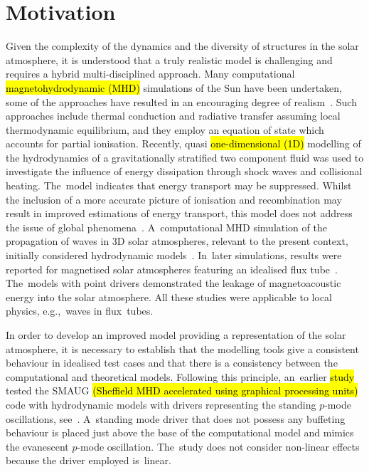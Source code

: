 \documentclass[physics,article,accept,pdftex,moreauthors]{Definitions/mdpi}
\begin{document}
\section{Motivation}\label{sec2}
\label{sec:motivation}

Given the complexity of the dynamics and the diversity of structures in the solar atmosphere, it is understood that a truly realistic model is challenging and  requires a hybrid multi-disciplined approach. Many computational 
 \hl{magnetohydrodynamic (MHD)}  
simulations of the Sun have been undertaken, some of the approaches have resulted in an encouraging degree of realism~\cite{Vogler2005,Gudiksen2011}. Such approaches include thermal conduction and radiative transfer assuming local thermodynamic equilibrium, and they employ an equation of state which accounts for partial ionisation.  Recently, quasi 
\hl{one-dimensional
(1D)}  
modelling of the hydrodynamics of a gravitationally stratified two component fluid was used to investigate the influence of energy dissipation through shock waves and collisional heating. The~model indicates that energy transport may be suppressed. Whilst the inclusion of a more accurate picture of ionisation and recombination may result in improved estimations of energy transport, this model does not address the issue of global phenomena~\cite{Zhang2021}. A~computational MHD simulation of the propagation of waves in 3D solar atmospheres, relevant to the present context, initially considered hydrodynamic models~\cite{Fedun2009a}.  In~later simulations, results were reported for magnetised solar atmospheres featuring an idealised flux tube~\cite{Fedun2009b,Vigeesh2012}. The~models with point drivers demonstrated the leakage of magnetoacoustic energy into the solar atmosphere. All these studies were applicable to local physics, e.g.,~waves in flux~tubes.   

In order to develop an improved model providing a representation of the solar atmosphere, it is necessary to establish that the modelling tools give a consistent behaviour in idealised test cases and that there is a consistency between the computational and theoretical models.  Following this principle, an~earlier 
 \hl{study}  
tested the SMAUG \hl{(Sheffield MHD accelerated using graphical processing units)} %
code with hydrodynamic models with drivers representing the standing $p$-mode oscillations, see~\cite{Griffiths2018b}. A~standing mode driver that does not possess any buffeting behaviour is placed just above the base of the computational model and mimics the evanescent $p$-mode oscillation. The~study does not consider non-linear effects because the driver employed is~linear.
\end{document}
